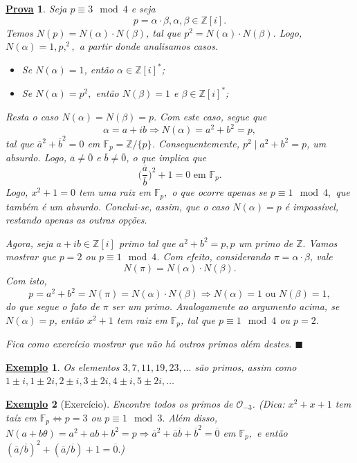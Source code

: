 \documentclass{article}
\newtheorem{example}{\underline{Exemplo}}
\newtheorem*{proof*}{\underline{Prova}}
\renewcommand\qedsymbol{$\blacksquare$}
\begin{document}
    \begin{proof*}
      Seja \(p\equiv 3\mod 4\) e seja 
      \[
        p = \alpha \cdot \beta , \alpha , \beta \in \mathbb{Z}[i].
      \]
      Temos \(N(p) = N(\alpha )\cdot N(\beta )\), tal que \(p^{2} = N(\alpha )\cdot N(\beta )\). Logo,
      \(N(\alpha ) = 1, p, ^{2},\) a partir donde analisamos casos.
      \begin{itemize}
        \item Se \(N(\alpha ) = 1\), então \(\alpha \in \mathbb{Z}[i]^{*}\);
        \item Se \(N(\alpha ) = p^{2},\) então \(N(\beta ) = 1\) e \(\beta \in \mathbb{Z}[i]^{*}\);
      \end{itemize}
      Resta o caso \(N(\alpha ) = N(\beta ) = p.\) Com este caso, segue que 
      \[
        \alpha = a + ib \Rightarrow N(\alpha ) = a^{2} + b^{2} = p,
      \]
      tal que \(\overline{a}^{2} + \overline{b}^{2} = 0\) em \(\mathbb{F}_{p} = \mathbb{Z}/\{p\}\). Consequentemente,
      \(p^{2}\mid a^{2}+b^{2} = p\), um absurdo. Logo, \(\overline{a}\neq \overline{0}\) e \(\overline{b}\neq \overline{0}\), o que implica que 
      \[
        \biggl(\frac{\overline{a}}{\overline{b}}\biggr)^{2} + 1 = 0 \text{ em } \mathbb{F}_{p}.
      \]
      Logo, \(x^{2} + 1 = 0\) tem uma raiz em \(\mathbb{F}_{p},\) o que ocorre apenas se \(p\equiv 1 \mod 4,\) que também
      é um absurdo. Conclui-se, assim, que o caso \(N(\alpha ) = p\) é impossível, restando apenas as outras opções.

      Agora, seja \(a+ib\in \mathbb{Z}[i]\) primo tal que \(a^{2} + b^{2} = p, p\) um primo de \(\mathbb{Z}.\)
      Vamos mostrar que \(p = 2\) ou \(p\equiv 1\mod 4\). Com efeito, considerando \(\pi  = \alpha \cdot \beta \), vale 
      \[
        N(\pi ) = N(\alpha )\cdot N(\beta ).
      \]
      Com isto, 
      \[
        p = a^{2} + b^{2} = N(\pi) = N(\alpha )\cdot N(\beta ) \Rightarrow N(\alpha ) = 1 \text{ ou } N(\beta ) = 1,
      \]
      do que segue o fato de \(\pi \) ser um primo. Analogamente ao argumento acima, se \(N(\alpha ) = p\), então \(x^{2} + 1\) tem raiz em \(\mathbb{F}_{p}\),
      tal que \(p\equiv 1 \mod 4\) ou \(p = 2\).

      Fica como exercício mostrar que não há outros primos além destes. \qedsymbol
    \end{proof*}
    \begin{example}
      Os elementos \(3, 7, 11, 19, 23, \dotsc\) são primos, assim como \(1\pm i, 1\pm 2i, 2\pm i, 3\pm 2i, 4\pm i, 5\pm 2i, \dotsc\) 
    \end{example}
    \begin{example}[Exercício]
      Encontre todos os primos de \(\mathcal{O}_{-3}\). (Dica: \(x^{2}+x+1\) tem taíz em
      \(\mathbb{F}_{p} \Longleftrightarrow p = 3\) ou \(p\equiv 1\mod 3.\) Além disso, \(N(a + b\theta ) 
      = a^{2} + ab + b^{2} = p \Rightarrow \overline{a}^{2} + \overline{a}\overline{b} + \overline{b}^{2} = \overline{0}\)
      em \(\mathbb{F}_{p},\) e então \((\overline{a}/\overline{b})^{2} + (\overline{a}/\overline{b}) + 1 = \overline{0}.\))
    \end{example}
    \newpage
\end{document}

